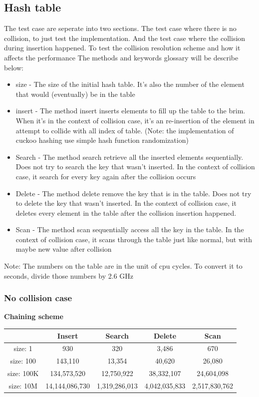 \documentclass{article} %
\begin{document}
    \subsection*{Hash table}
    The test case are seperate into two sections.
    The test case where there is no collision, to just test the implementation.
    And the test case where the collision during insertion happened. To test the collision resolution scheme and how it affects the performance
    The methods and keywords glossary will be describe below:
    \begin{itemize}
        \item size - The size of the initial hash table.
        It's also the number of the element that would (eventually) be in the table
        \item insert - The method insert inserts elements to fill up the table to the brim.
        When it's in the context of collision case, it's an re-insertion of the element in attempt to collide with all index of table.
        (Note: the implementation of cuckoo hashing use simple hash function randomization)
        \item Search - The method search retrieve all the inserted elements sequentially.
        Does not try to search the key that wasn't inserted.
        In the context of collision case, it search for every key again after the collision occurs
        \item Delete - The method delete remove the key that is in the table.
        Does not try to delete the key that wasn't inserted.
        In the context of collision case, it deletes every element in the table after the collision insertion happened.
        \item Scan - The method scan sequentially access all the key in the table.
        In the context of collision case, it scans through the table just like normal, but with maybe new value after collision
    \end{itemize}

    Note: The numbers on the table are in the unit of cpu cycles.
    To convert it to seconds, divide those numbers by 2.6 GHz

    \subsubsection*{No collision case}
    \textbf{Chaining scheme}
    \begin{center}
        \begin{tabular}{|c|c|c|c|c|}\hline
        & Insert & Search & Delete & Scan\\\hline
        size: 1 & 930 & 320 & 3,486 & 670\\\hline
        size: 100 & 143,110 & 13,354 & 40,620 & 26,080\\\hline
        size: 100K & 134,573,520 & 12,750,922 & 38,332,107 & 24,604,098\\\hline
        size: 10M & 14,144,086,730 & 1,319,286,013 & 4,042,035,833 & 2,517,830,762\\\hline
        \end{tabular}
    \end{center}
\end{document}
